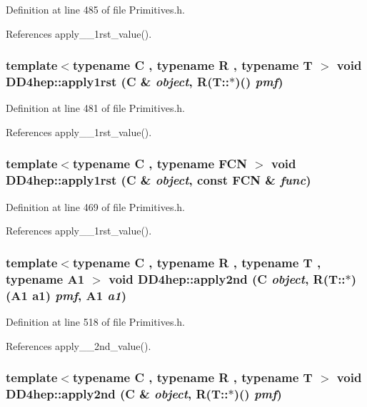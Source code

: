 Definition at line 485 of file Primitives.h.

References apply\_\-\_\-1rst\_\-value().\hypertarget{namespace_d_d4hep_a7b470d25c1c3c50b01353866d4df45b8}{
\subsubsection[{apply1rst}]{\setlength{\rightskip}{0pt plus 5cm}template$<$typename C , typename R , typename T $>$ void DD4hep::apply1rst (C \& {\em object}, \/  R(T::$\ast$)() {\em pmf})}}
\label{namespace_d_d4hep_a7b470d25c1c3c50b01353866d4df45b8}


Definition at line 481 of file Primitives.h.

References apply\_\-\_\-1rst\_\-value().\hypertarget{namespace_d_d4hep_ad57af591165d8b8d820fe80029157e18}{
\subsubsection[{apply1rst}]{\setlength{\rightskip}{0pt plus 5cm}template$<$typename C , typename FCN $>$ void DD4hep::apply1rst (C \& {\em object}, \/  const FCN \& {\em func})}}
\label{namespace_d_d4hep_ad57af591165d8b8d820fe80029157e18}


Definition at line 469 of file Primitives.h.

References apply\_\-\_\-1rst\_\-value().\hypertarget{namespace_d_d4hep_a650e5d4f3c98aec06caa072a5cd89522}{
\subsubsection[{apply2nd}]{\setlength{\rightskip}{0pt plus 5cm}template$<$typename C , typename R , typename T , typename A1 $>$ void DD4hep::apply2nd (C {\em object}, \/  R(T::$\ast$)(A1 a1) {\em pmf}, \/  A1 {\em a1})}}
\label{namespace_d_d4hep_a650e5d4f3c98aec06caa072a5cd89522}


Definition at line 518 of file Primitives.h.

References apply\_\-\_\-2nd\_\-value().\hypertarget{namespace_d_d4hep_ac6576c9c96df03d7042f00e804163831}{
\subsubsection[{apply2nd}]{\setlength{\rightskip}{0pt plus 5cm}template$<$typename C , typename R , typename T $>$ void DD4hep::apply2nd (C \& {\em object}, \/  R(T::$\ast$)() {\em pmf})}}
\label{namespace_d_d4hep_ac6576c9c96df03d7042f00e804163831}


